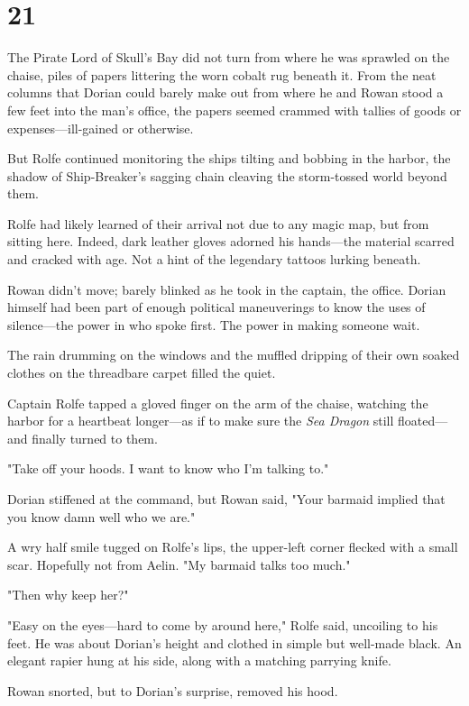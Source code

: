 
\chapter{21}

The Pirate Lord of Skull's Bay did not turn from where he was sprawled on the chaise, piles of papers littering the worn cobalt rug beneath it. From the neat columns that Dorian could barely make out from where he and Rowan stood a few feet into the man's office, the papers seemed crammed with tallies of goods or expenses---ill-gained or otherwise.

But Rolfe continued monitoring the ships tilting and bobbing in the harbor, the shadow of Ship-Breaker's sagging chain cleaving the storm-tossed world beyond them.

Rolfe had likely learned of their arrival not due to any magic map, but from sitting here. Indeed, dark leather gloves adorned his hands---the material scarred and cracked with age. Not a hint of the legendary tattoos lurking beneath.

Rowan didn't move; barely blinked as he took in the captain, the office. Dorian himself had been part of enough political maneuverings to know the uses of silence---the power in who spoke first. The power in making someone wait.

The rain drumming on the windows and the muffled dripping of their own soaked clothes on the threadbare carpet filled the quiet.

Captain Rolfe tapped a gloved finger on the arm of the chaise, watching the harbor for a heartbeat longer---as if to make sure the \emph{Sea Dragon} still floated--- and finally turned to them.

"Take off your hoods. I want to know who I'm talking to."

Dorian stiffened at the command, but Rowan said, "Your barmaid implied that you know damn well who we are."

A wry half smile tugged on Rolfe's lips, the upper-left corner flecked with a small scar. Hopefully not from Aelin. "My barmaid talks too much."

"Then why keep her?"

"Easy on the eyes---hard to come by around here," Rolfe said, uncoiling to his feet. He was about Dorian's height and clothed in simple but well-made black. An elegant rapier hung at his side, along with a matching parrying knife.

Rowan snorted, but to Dorian's surprise, removed his hood.

